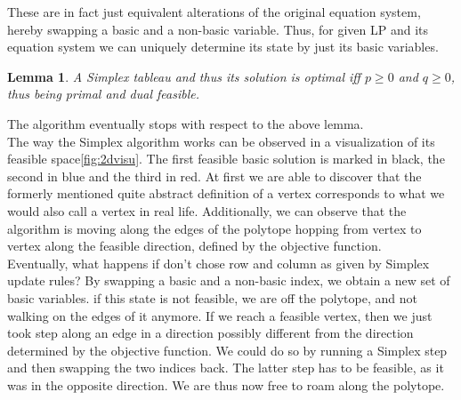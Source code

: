 \documentclass[a4paper, 11pt]{article}
\newtheorem{lemma}{Lemma}
\begin{document}
These are in fact just equivalent alterations of the original equation system, hereby swapping a basic and a non-basic variable. Thus, for given LP and its equation system we can uniquely determine its state by just its basic variables. 

\begin{lemma}
	A Simplex tableau and thus its solution is optimal iff $p\geq0$ and $q\geq0$, thus being primal and dual feasible.
\end{lemma}

The algorithm eventually stops with respect to the above lemma. \\

The way the Simplex algorithm works can be observed in a visualization of its feasible space\ref{fig:2dvisu}. The first feasible basic solution is marked in black, the second in blue and the third in red. At first we are able to discover that the formerly mentioned quite abstract definition of a vertex corresponds to what we would also call a vertex in real life. Additionally, we can observe that the algorithm is moving along the edges of the polytope hopping from vertex to vertex along the feasible direction, defined by the objective function. \\

Eventually, what happens if don't chose row and column as given by Simplex update rules? By swapping a basic and a non-basic index, we obtain a new set of basic variables. if this state is not feasible, we are off the polytope, and not walking on the edges of it anymore. If we reach a feasible vertex, then we just took step along an edge in a direction possibly different from the direction determined by the objective function. We could do so by running a Simplex step and then swapping the two indices back. The latter step has to be feasible, as it was in the opposite direction. We are thus now free to roam along the polytope.
\end{document}
